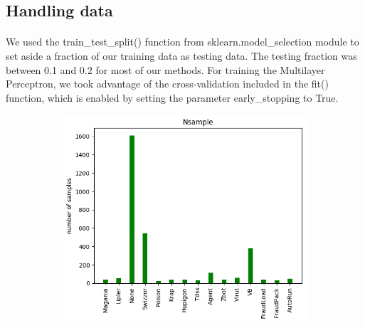 \documentclass[11pt]{article}
\begin{document}
\subsection{Handling data}
\paragraph{} We used the train\_test\_split() function from sklearn.model\_selection module to set aside a fraction of our training data as testing data. The testing fraction was between 0.1 and 0.2 for most of our methods. For training the Multilayer Perceptron, we took advantage of the cross-validation included in the fit() function, which is enabled by setting the parameter early\_stopping to True.\\
\begin{figure}[] 
\centering
    \begin{subfigure}[!t]{0.3\textwidth}
        \includegraphics[width=\textwidth]{Plots/Nsample.png}
    \end{subfigure}
        \begin{subfigure}[!t]{0.3\textwidth}

\end{subfigure}
\end{figure}
\end{document}
